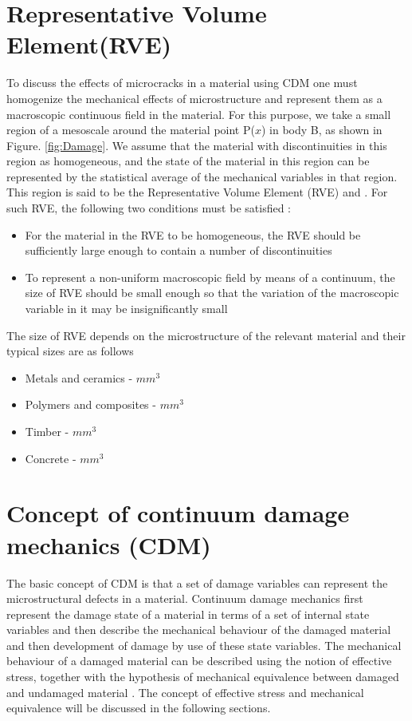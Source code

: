 \documentclass[12pt,a4paper,twoside,openright]{report}
\begin{document}
\section{Representative Volume Element(RVE)}
\indent\indent\indent  To discuss the effects of microcracks in a material using CDM one must homogenize the mechanical effects of microstructure and represent them as a macroscopic continuous field in the material. For this purpose, we take a small region of a mesoscale around the material point P($x$) in body B, as shown in Figure. \ref{fig:Damage}. We assume that the material with discontinuities in this region as homogeneous, and the state of the material in this region can be represented by the statistical average of the mechanical variables in that region. This region is said to be the Representative Volume Element (RVE) \citep{hill1963elastic} and \citep{hashin1983analysis}. For such RVE, the following two conditions must be satisfied \citep{murakami2012continuum}:
\begin{itemize}
\item  For the material in the RVE to be homogeneous, the RVE should be sufficiently large enough to contain a number of discontinuities
\item To represent a non-uniform macroscopic field by means of a continuum, the size of RVE should be small enough so that the variation of the macroscopic variable in it may be insignificantly small 
\end{itemize}
The size of RVE depends on the microstructure of the relevant material and their typical sizes are as follows \citep{lemaitre2012course}
\begin{itemize}
\item Metals and ceramics  \;    -    \;$mm^3$
\item Polymers and composites \;   -   \;$mm^3$
\item Timber\; - \;$mm^3$
\item Concrete \; - \;$mm^3$
\end{itemize}

\section{Concept of continuum damage mechanics (CDM)}
\indent\indent\indent The basic concept of CDM is that a set of damage variables can represent the microstructural defects in a material. Continuum damage mechanics first represent the damage state of a material in terms of a set of internal state variables and then describe the mechanical behaviour of the damaged material and then development of damage by use of these state variables. The mechanical behaviour of a damaged material can be described using the notion of effective stress, together with the hypothesis of mechanical equivalence between damaged and undamaged material \citep{murakami2012continuum}. The concept of effective stress and mechanical equivalence will be discussed in the following sections.
\end{document}
